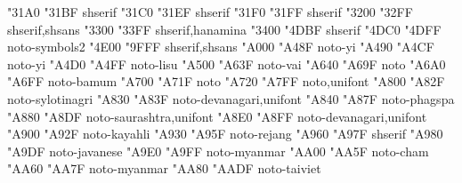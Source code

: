 \documentclass{article}
\begin{document}
                              {  "31A0} {  "31BF} {shserif}
                                    {  "31C0} {  "31EF} {shserif}
                   {  "31F0} {  "31FF} {shserif}
                {  "3200} {  "32FF} {shserif,shsans}
                              {  "3300} {  "33FF} {shserif,hanamina}
             {  "3400} {  "4DBF} {shserif}
                        {  "4DC0} {  "4DFF} {noto-symbols2}
                         {  "4E00} {  "9FFF} {shserif,shsans}
                                   {  "A000} {  "A48F} {noto-yi}
                                    {  "A490} {  "A4CF} {noto-yi}
                                           {  "A4D0} {  "A4FF} {noto-lisu}
                                            {  "A500} {  "A63F} {noto-vai}
                            {  "A640} {  "A69F} {noto}
                                          {  "A6A0} {  "A6FF} {noto-bamum}
                          {  "A700} {  "A71F} {noto}
                               {  "A720} {  "A7FF} {noto,unifont}
                                   {  "A800} {  "A82F} {noto-sylotinagri}
                      {  "A830} {  "A83F} {noto-devanagari,unifont}
                                       {  "A840} {  "A87F} {noto-phagspa}
                                     {  "A880} {  "A8DF} {noto-saurashtra,unifont}
                            {  "A8E0} {  "A8FF} {noto-devanagari,unifont}
                                       {  "A900} {  "A92F} {noto-kayahli}
                                         {  "A930} {  "A95F} {noto-rejang}
                         {  "A960} {  "A97F} {shserif}
                                       {  "A980} {  "A9DF} {noto-javanese}
                             {  "A9E0} {  "A9FF} {noto-myanmar}
                                           {  "AA00} {  "AA5F} {noto-cham}
                             {  "AA60} {  "AA7F} {noto-myanmar}
                                       {  "AA80} {  "AADF} {noto-taiviet}
\end{document}
